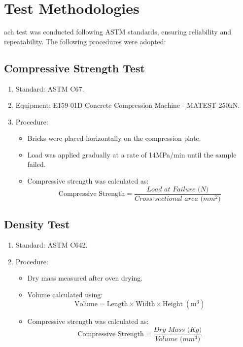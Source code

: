 \section{Test Methodologies}
ach test was conducted following ASTM standards, ensuring reliability and
repeatability. The following procedures were adopted:

\subsection{Compressive Strength Test}
\begin{enumerate}
	\item Standard: ASTM C67.
	\item Equipment: E159-01D Concrete Compression Machine - MATEST 250kN.
	\item Procedure:
	      \begin{itemize}
		      \item Bricks were placed horizontally on the compression plate.
		      \item Load was applied gradually at a rate of 14MPa/min until the sample failed.
		      \item Compressive strength was calculated as:
		            \[
			            \text{Compressive Strength} =
			            \frac{\textit{Load at Failure (N)}}{\textit{Cross sectional area (mm$^2$)}}
		            \]
	      \end{itemize}
\end{enumerate}

\subsection{Density Test}
\begin{enumerate}
	\item Standard: ASTM C642.
	\item Procedure:
	      \begin{itemize}
		      \item Dry mass measured after oven drying.
		      \item Volume calculated using:
		            \[
			            \text{Volume} = \text{Length} \times \text{Width} \times \text{Height} \; (\text{m}^3)
		            \]
		      \item Compressive strength was calculated as:
		            \[
			            \text{Compressive Strength} =
			            \frac{\textit{Dry Mass (Kg)}}{\textit{Volume (mm$^3$)}}
		            \]
	      \end{itemize}
\end{enumerate}

